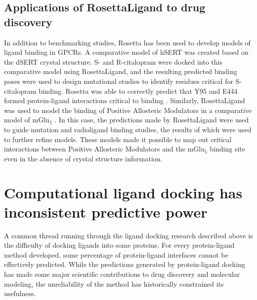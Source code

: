\subsection{Applications of RosettaLigand to drug discovery}
In addition to benchmarking studies, Rosetta has been used to develop models of ligand binding in \ac{GPCR}s.
A comparative model of hSERT was created based on the dSERT crystal structure.
S- and R-citalopram were docked into this comparative model using RosettaLigand, and the resulting predicted binding poses were used to design mutational studies to identify residues critical for S-citalopram binding.
Rosetta was able to correctly predict that Y95 and E444 formed protein-ligand interactions critical to binding \citep{Combs:2011db}.
Similarly, RosettaLigand was used to model the binding of Positive Allosteric Modulators in a comparative model of mGlu$_{5}$ \citep{Turlington:2013et}.
In this case, the predictions made by RosettaLigand were used to guide mutation and radioligand binding studies, the results of which were used to further refine models.
These models made it possible to map out critical interactions between Positive Allosteric Modulators and the mGlu$_{5}$ binding site even in the absence of crystal structure information.

\section{Computational ligand docking has inconsistent predictive power}

A common thread running through the ligand docking research described above is the difficulty of docking ligands into some proteins.
For every protein-ligand method developed, some percentage of protein-ligand interfaces cannot be effectively predicted.
While the predictions generated by protein-ligand docking has made some major scientific contributions to drug discovery and molecular modeling, the unreliability of the method has historically constrained its usefulness.

